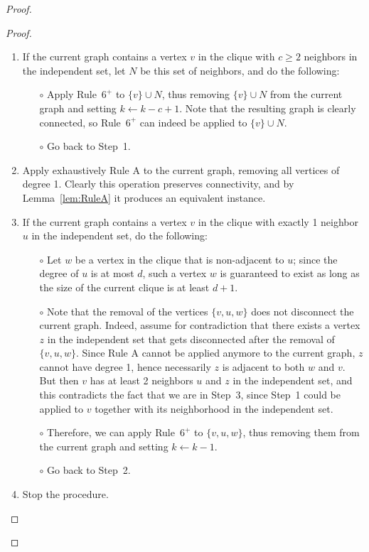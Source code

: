 \documentclass[
final
]{dmtcs-episciences}
\begin{document}
\begin{proof}
\begin{proof}
\begin{enumerate}
\item If the current graph contains a vertex $v$ in the clique with $c \geq 2$ neighbors in the independent set, let $N$ be this set of neighbors, and do the following:
    \begin{itemize}
\item[$\circ$] Apply Rule~$6^+$ to $\{v\} \cup N$, thus removing $\{v\} \cup N$ from the current graph and setting $k \leftarrow k - c +1$. Note that the resulting graph is clearly connected, so Rule~$6^+$ can indeed be applied to $\{v\} \cup N$.
     \item[$\circ$] Go back to Step~1.
    \end{itemize}
\item Apply exhaustively Rule A to the current graph, removing all vertices of degree 1. Clearly this operation preserves connectivity, and by Lemma~\ref{lem:RuleA} it produces an equivalent instance.
\item If the current graph contains a vertex $v$ in the clique with exactly 1 neighbor $u$ in the independent set, do the following:
    \begin{itemize}
    \item[$\circ$] Let $w$ be a vertex in the clique that is non-adjacent to $u$; since the degree of $u$ is at most $d$, such a vertex $w$ is guaranteed to exist as long as the size of the current clique is at least $d+1$.
    \item[$\circ$] Note that the removal of the vertices $\{v,u,w\}$ does not disconnect the current graph. Indeed, assume for contradiction that there exists a vertex $z$ in the independent set that gets disconnected after the removal of $\{v,u,w\}$. Since Rule A cannot be applied anymore to the current graph, $z$ cannot have degree 1, hence necessarily $z$ is adjacent to both $w$ and $v$. But then $v$ has at least 2 neighbors $u$ and $z$ in the independent set, and this contradicts the fact that we are in Step~3, since Step~1 could be applied to $v$ together with its neighborhood in the independent set.
     \item[$\circ$] Therefore, we can apply Rule~$6^+$ to  $\{v,u,w\}$, thus removing them from the current graph and setting $k \leftarrow k - 1$.
    \item[$\circ$] Go back to Step~2.
    \end{itemize}
 \item Stop the procedure.
\end{enumerate}




\end{proof}
\end{proof}
\end{document}
